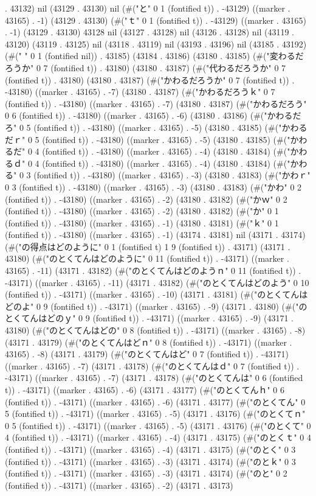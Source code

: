 . 43132) nil (43129 . 43130) nil (#("と" 0 1 (fontified t)) . -43129) ((marker . 43165) . -1) (43129 . 43130) (#("ｔ" 0 1 (fontified t)) . -43129) ((marker . 43165) . -1) (43129 . 43130) 43128 nil (43127 . 43128) nil (43126 . 43128) nil (43119 . 43120) (43119 . 43125) nil (43118 . 43119) nil (43193 . 43196) nil (43185 . 43192) (#(" " 0 1 (fontified nil)) . 43185) (43184 . 43186) (43180 . 43185) (#("変わるだろうか" 0 7 (fontified t)) . 43180) (43180 . 43187) (#("代わるだろうか" 0 7 (fontified t)) . 43180) (43180 . 43187) (#("かわるだろうか" 0 7 (fontified t)) . -43180) ((marker . 43165) . -7) (43180 . 43187) (#("かわるだろうｋ" 0 7 (fontified t)) . -43180) ((marker . 43165) . -7) (43180 . 43187) (#("かわるだろう" 0 6 (fontified t)) . -43180) ((marker . 43165) . -6) (43180 . 43186) (#("かわるだろ" 0 5 (fontified t)) . -43180) ((marker . 43165) . -5) (43180 . 43185) (#("かわるだｒ" 0 5 (fontified t)) . -43180) ((marker . 43165) . -5) (43180 . 43185) (#("かわるだ" 0 4 (fontified t)) . -43180) ((marker . 43165) . -4) (43180 . 43184) (#("かわるｄ" 0 4 (fontified t)) . -43180) ((marker . 43165) . -4) (43180 . 43184) (#("かわる" 0 3 (fontified t)) . -43180) ((marker . 43165) . -3) (43180 . 43183) (#("かわｒ" 0 3 (fontified t)) . -43180) ((marker . 43165) . -3) (43180 . 43183) (#("かわ" 0 2 (fontified t)) . -43180) ((marker . 43165) . -2) (43180 . 43182) (#("かｗ" 0 2 (fontified t)) . -43180) ((marker . 43165) . -2) (43180 . 43182) (#("か" 0 1 (fontified t)) . -43180) ((marker . 43165) . -1) (43180 . 43181) (#("ｋ" 0 1 (fontified t)) . -43180) ((marker . 43165) . -1) (43174 . 43181) nil (43171 . 43174) (#("の得点はどのように" 0 1 (fontified t) 1 9 (fontified t)) . 43171) (43171 . 43180) (#("のとくてんはどのように" 0 11 (fontified t)) . -43171) ((marker . 43165) . -11) (43171 . 43182) (#("のとくてんはどのようｎ" 0 11 (fontified t)) . -43171) ((marker . 43165) . -11) (43171 . 43182) (#("のとくてんはどのよう" 0 10 (fontified t)) . -43171) ((marker . 43165) . -10) (43171 . 43181) (#("のとくてんはどのよ" 0 9 (fontified t)) . -43171) ((marker . 43165) . -9) (43171 . 43180) (#("のとくてんはどのｙ" 0 9 (fontified t)) . -43171) ((marker . 43165) . -9) (43171 . 43180) (#("のとくてんはどの" 0 8 (fontified t)) . -43171) ((marker . 43165) . -8) (43171 . 43179) (#("のとくてんはどｎ" 0 8 (fontified t)) . -43171) ((marker . 43165) . -8) (43171 . 43179) (#("のとくてんはど" 0 7 (fontified t)) . -43171) ((marker . 43165) . -7) (43171 . 43178) (#("のとくてんはｄ" 0 7 (fontified t)) . -43171) ((marker . 43165) . -7) (43171 . 43178) (#("のとくてんは" 0 6 (fontified t)) . -43171) ((marker . 43165) . -6) (43171 . 43177) (#("のとくてんｈ" 0 6 (fontified t)) . -43171) ((marker . 43165) . -6) (43171 . 43177) (#("のとくてん" 0 5 (fontified t)) . -43171) ((marker . 43165) . -5) (43171 . 43176) (#("のとくてｎ" 0 5 (fontified t)) . -43171) ((marker . 43165) . -5) (43171 . 43176) (#("のとくて" 0 4 (fontified t)) . -43171) ((marker . 43165) . -4) (43171 . 43175) (#("のとくｔ" 0 4 (fontified t)) . -43171) ((marker . 43165) . -4) (43171 . 43175) (#("のとく" 0 3 (fontified t)) . -43171) ((marker . 43165) . -3) (43171 . 43174) (#("のとｋ" 0 3 (fontified t)) . -43171) ((marker . 43165) . -3) (43171 . 43174) (#("のと" 0 2 (fontified t)) . -43171) ((marker . 43165) . -2) (43171 . 43173) 